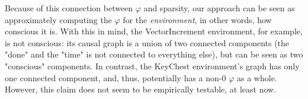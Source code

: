 \documentclass[a4paper,11pt,oneside]{report}
\begin{document}
Because of this connection between $\varphi$ and sparsity, our approach can be seen as approximately computing the $\varphi$ for the {\em environment}, in other words, how conscious it is. With this in mind, the VectorIncrement environment, for example, is not conscious: its causal graph is a union of two connected components (the "done" and the "time" is not connected to everything else), but can be seen as two "conscious" components. In contrast, the KeyChest environment's graph has only one connected component, and, thus, potentially has a non-$0$ $\varphi$ as a whole. However, this claim does not seem to be empirically testable, at least now.

%
%


\cleardoublepage
{}
{}


\end{document}
